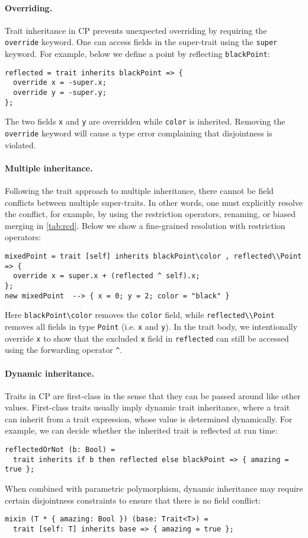 \paragraph{Overriding.}
Trait inheritance in CP prevents unexpected overriding by requiring the
\lstinline{override} keyword. One can access fields in the super-trait using the
\lstinline{super} keyword. For example, below we define a point by reflecting
\lstinline{blackPoint}:
\begin{lstlisting}
reflected = trait inherits blackPoint => {
  override x = -super.x;
  override y = -super.y;
};
\end{lstlisting}
The two fields \lstinline{x} and \lstinline{y} are overridden while
\lstinline{color} is inherited. Removing the \lstinline{override} keyword will
cause a type error complaining that disjointness is violated.

\paragraph{Multiple inheritance.}
Following the trait approach to multiple inheritance, there cannot be field
conflicts between multiple super-traits. In other words, one must explicitly
resolve the conflict, for example, by using the restriction operators, renaming,
or biased merging in \autoref{tab:rcd}. Below we show a fine-grained resolution
with restriction operators:
\begin{lstlisting}
mixedPoint = trait [self] inherits blackPoint\color , reflected\\Point => {
  override x = super.x + (reflected ^ self).x;
};
new mixedPoint  --> { x = 0; y = 2; color = "black" }
\end{lstlisting}
Here \lstinline{blackPoint\color} removes the \lstinline{color} field, while
\lstinline{reflected\\Point} removes all fields in type \lstinline{Point} (i.e.
\lstinline{x} and \lstinline{y}). In the trait body, we intentionally override
\lstinline{x} to show that the excluded \lstinline{x} field in
\lstinline{reflected} can still be accessed using the forwarding operator
\lstinline{^}.

\paragraph{Dynamic inheritance.}
Traits in CP are first-class in the sense that they can be passed around like
other values. First-class traits usually imply dynamic trait inheritance, where
a trait can inherit from a trait expression, whose value is determined
dynamically. For example, we can decide whether the inherited trait is reflected
at run time:
\begin{lstlisting}
reflectedOrNot (b: Bool) =
  trait inherits if b then reflected else blackPoint => { amazing = true };
\end{lstlisting}
When combined with parametric polymorphism, dynamic inheritance may require
certain disjointness constraints to ensure that there is no field conflict:
\begin{lstlisting}
mixin (T * { amazing: Bool }) (base: Trait<T>) =
  trait [self: T] inherits base => { amazing = true };
\end{lstlisting}

